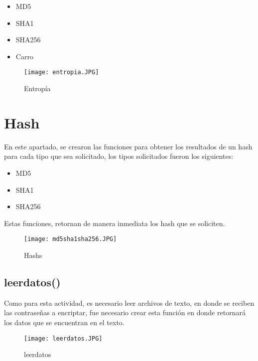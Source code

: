 \documentclass{article}
\begin{document}
\begin{itemize}
    \item MD5
    \item SHA1
    \item SHA256
    \item Carro
\end{itemize}

\begin{figure}[h]
    \centering
    \texttt{[image: entropia.JPG]}
    \caption{Entropía}
    \label{fig:my_label}
\end{figure}
\newpage
\section{Hash}
En este apartado, se crearon las funciones para obtener los resultados de un hash para cada tipo que sea solicitado, los tipos solicitados fueron los siguientes:
\begin{itemize}
    \item MD5
    \item SHA1
    \item  SHA256
\end{itemize}
Estas funciones, retornan de manera inmediata los hash que se soliciten.
\begin{figure}[h]
    \centering
    \texttt{[image: md5sha1sha256.JPG]}
    \caption{Hashs}
    \label{fig:my_label}
\end{figure}

\subsection{leerdatos()}
Como para esta actividad, es necesario leer archivos de texto, en donde se reciben las contraseñas a encriptar, fue necesario crear esta función en donde retornará los datos que se encuentran en el texto. 
\begin{figure}[h]
    \centering
    \texttt{[image: leerdatos.JPG]}
    \caption{leerdatos}
    \label{fig:my_label}
\end{figure}
\end{document}
